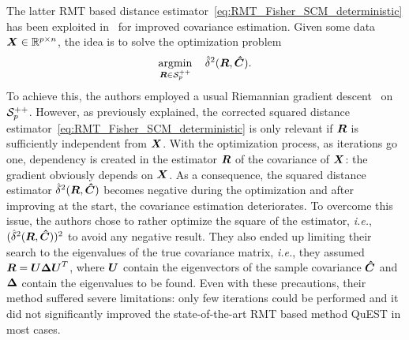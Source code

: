 \documentclass{article}
\theoremstyle{plain}
\theoremstyle{definition}
\theoremstyle{remark}
\begin{document}
The latter RMT based distance estimator~\eqref{eq:RMT_Fisher_SCM_deterministic} has been exploited in~\cite{tiomoko2019random} for improved covariance estimation. 
Given some data $\boldsymbol{X}\in\mathbb{R}^{p\times n}$, the idea is to solve the optimization problem
\begin{equation}
    \operatorname*{argmin}_{\boldsymbol{R}\in\mathcal{S}^{++}_{p}} \quad \hat{\delta}^2(\boldsymbol{R},\boldsymbol{\hat{C}}).
\label{eq:RMT_cov_optim_problem}
\end{equation}
To achieve this, the authors employed a usual Riemannian gradient descent~\cite{absil2009optimization} on $\mathcal{S}^{++}_{p}$.
However, as previously explained, the corrected squared distance estimator~\eqref{eq:RMT_Fisher_SCM_deterministic} is only relevant if $\boldsymbol{R}$ is sufficiently independent from $\boldsymbol{X}$.
With the optimization process, as iterations go one, dependency is created in the estimator $\boldsymbol{R}$ of the covariance of $\boldsymbol{X}$: the gradient obviously depends on $\boldsymbol{X}$.
As a consequence, the squared distance estimator $\hat{\delta}^2(\boldsymbol{R},\boldsymbol{\hat{C}})$ becomes negative during the optimization and after improving at the start, the covariance estimation deteriorates.
To overcome this issue, the authors chose to rather optimize the square of the estimator, \emph{i.e.}, $(\hat{\delta}^2(\boldsymbol{R},\boldsymbol{\hat{C}}))^2$ to avoid any negative result.
They also ended up limiting their search to the eigenvalues of the true covariance matrix, \emph{i.e.}, they assumed $\boldsymbol{R}=\boldsymbol{U}\boldsymbol{\Delta}\boldsymbol{U}^T$, where $\boldsymbol{U}$ contain the eigenvectors of the sample covariance $\boldsymbol{\hat{C}}$ and $\boldsymbol{\Delta}$ contain the eigenvalues to be found.
Even with these precautions, their method suffered severe limitations: only few iterations could be performed and it did not significantly improved the state-of-the-art RMT based method QuEST in most cases. 
\end{document}
